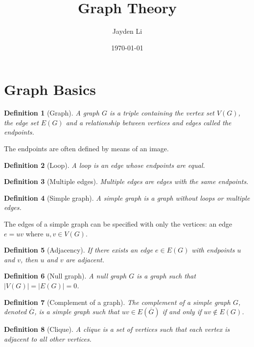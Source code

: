 \documentclass{article}
\title{\vspace*{-40pt}Graph Theory}
\author{Jayden Li}
\date{\today}
\newtheorem{defn}{Definition}[section]
\begin{document}
\fontsize{12pt}{12pt}\selectfont
\sectionfont{\fontsize{16}{16}\selectfont}
\subsectionfont{\fontsize{14}{14}\selectfont}
\maketitle

\section{Graph Basics}
\begin{defn}[Graph]
	A graph $G$ is a triple containing the vertex set $V(G)$, the edge set $E(G)$ and a relationship between vertices and edges called the endpoints.
\end{defn}
The endpoints are often defined by means of an image.

\begin{defn}[Loop]
	A loop is an edge whose endpoints are equal.
\end{defn}

\begin{defn}[Multiple edges]
	Multiple edges are edges with the same endpoints.
\end{defn}

\begin{defn}[Simple graph]
	A simple graph is a graph without loops or multiple edges.
\end{defn}

The edges of a simple graph can be specified with only the vertices: an edge $e=uv$ where $u,v\in V(G)$.

\begin{defn}[Adjacency]
	If there exists an edge $e\in E(G)$ with endpoints $u$ and $v$, then $u$ and $v$ are adjacent.
\end{defn}

\begin{defn}[Null graph]
	A null graph $G$ is a graph such that $\left|V(G)\right|=\left|E(G)\right|=0$.
\end{defn}

\begin{defn}[Complement of a graph]
	The complement of a simple graph $G$, denoted $\overline G$, is a simple graph such that $uv\in E(\overline G)$ if and only if $uv\not\in E(G)$.
\end{defn}

\begin{defn}[Clique]
	A clique is a set of vertices such that each vertex is adjacent to all other vertices.
\end{defn}
\end{document}
